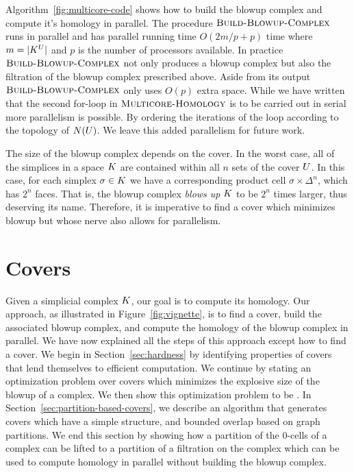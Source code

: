 Algorithm~\ref{fig:multicore-code} shows how to build the blowup complex and compute it's homology in parallel. The procedure $\textnormal{\scshape Build-Blowup-Complex}$ runs in parallel and has parallel running time $O(2m/p + p)$ time where $m = |K^{U}|$ and $p$ is the number of processors available. In practice $\textnormal{\scshape Build-Blowup-Complex}$ not only produces a blowup complex but also the filtration of the blowup complex prescribed above. Aside from its output $\textnormal{\scshape Build-Blowup-Complex}$ only uses $O(p)$ extra space. While we have written that the second for-loop in $\textnormal{\scshape Multicore-Homology}$ is to be carried out in serial more parallelism is possible. By ordering the iterations of the loop according to the topology of $N(U)$. We leave this added parallelism for future work.
 
The size of the blowup complex depends on the cover. In the worst case, all of 
the simplices in a space $K$ are contained within all $n$ sets of the cover 
$U$. In this case, for each simplex $\sigma \in K$ we have a corresponding 
product cell $\sigma \times \Delta^n$, which has $2^n$ faces. That is, the 
blowup complex \emph{blows up} $K$ to be $2^n$ times larger, thus deserving 
its name. Therefore, it is imperative to find a cover which minimizes blowup but whose
nerve also allows for parallelism. 

\section{Covers}
\label{sec:covers}
Given a simplicial complex $K$, our goal is to compute its homology.  
Our approach, as illustrated in Figure~\ref{fig:vignette}, is to find a cover, 
build the associated blowup complex, and compute the homology of the blowup complex in 
parallel. We have now explained all the steps of this approach except how to find a cover. 
We begin in Section~\ref{sec:hardness} by identifying 
properties of covers that lend themselves to efficient computation.
We continue by stating an optimization problem over covers which 
minimizes the explosive size of the blowup of a complex. We then show this optimization problem to be \NPH{}.  
In Section~\ref{sec:partition-based-covers}, we describe an algorithm 
that generates covers which have a simple structure, and bounded overlap 
based on graph partitions. We end this section by showing how a partition of the 
0-cells of a complex can be lifted to a partition of a filtration on the complex 
which can be used to compute homology in parallel without building the blowup complex.
